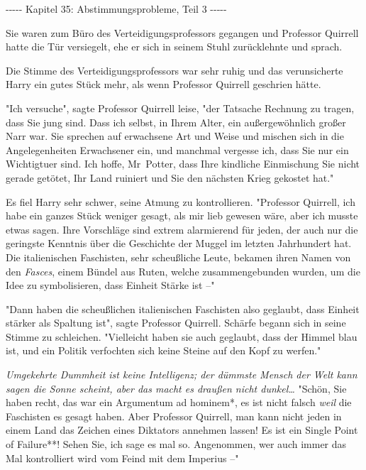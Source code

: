 

\hypertarget{abstimmungsprobleme-teil-3}{%

-\/-\/-\/-\/- Kapitel 35: Abstimmungsprobleme, Teil 3 -\/-\/-\/-\/-

Sie waren zum Büro des Verteidigungsprofessors gegangen und Professor Quirrell hatte die Tür versiegelt, ehe er sich in seinem Stuhl zurücklehnte und sprach.

Die Stimme des Verteidigungsprofessors war sehr ruhig und das verunsicherte Harry ein gutes Stück mehr, als wenn Professor Quirrell geschrien hätte.

"Ich versuche", sagte Professor Quirrell leise, "der Tatsache Rechnung zu tragen, dass Sie jung sind. Dass ich selbst, in Ihrem Alter, ein außergewöhnlich großer Narr war. Sie sprechen auf erwachsene Art und Weise und mischen sich in die Angelegenheiten Erwachsener ein, und manchmal vergesse ich, dass Sie nur ein Wichtigtuer sind. Ich hoffe, Mr~Potter, dass Ihre kindliche Einmischung Sie nicht gerade getötet, Ihr Land ruiniert und Sie den nächsten Krieg gekostet hat."

Es fiel Harry sehr schwer, seine Atmung zu kontrollieren. "Professor Quirrell, ich habe ein ganzes Stück weniger gesagt, als mir lieb gewesen wäre, aber ich musste etwas sagen. Ihre Vorschläge sind extrem alarmierend für jeden, der auch nur die geringste Kenntnis über die Geschichte der Muggel im letzten Jahrhundert hat. Die italienischen Faschisten, sehr scheußliche Leute, bekamen ihren Namen von den \emph{Fasces}, einem Bündel aus Ruten, welche zusammengebunden wurden, um die Idee zu symbolisieren, dass Einheit Stärke ist --"

"Dann haben die scheußlichen italienischen Faschisten also geglaubt, dass Einheit stärker als Spaltung ist", sagte Professor Quirrell. Schärfe begann sich in seine Stimme zu schleichen. "Vielleicht haben sie auch geglaubt, dass der Himmel blau ist, und ein Politik verfochten sich keine Steine auf den Kopf zu werfen."

\emph{Umgekehrte Dummheit ist keine Intelligenz; der dümmste Mensch der Welt kann sagen die Sonne scheint, aber das macht es draußen nicht dunkel…} "Schön, Sie haben recht, das war ein Argumentum ad hominem*, es ist nicht falsch \emph{weil} die Faschisten es gesagt haben. Aber Professor Quirrell, man kann nicht jeden in einem Land das Zeichen eines Diktators annehmen lassen! Es ist ein Single Point of Failure**! Sehen Sie, ich sage es mal so. Angenommen, wer auch immer das Mal kontrolliert wird vom Feind mit dem Imperius --"

}
